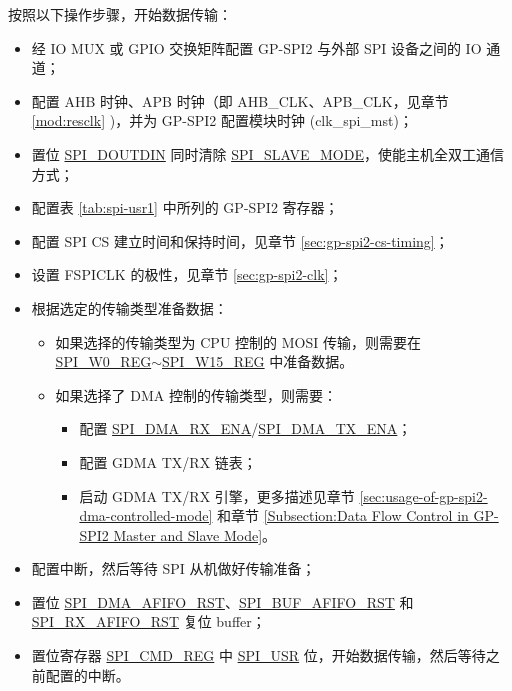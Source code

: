 \documentclass[main\_\_CN.tex]{subfiles}
\begin{document}
按照以下操作步骤，开始数据传输：
\begin{itemize}
    \item 经 IO MUX 或 GPIO 交换矩阵配置 GP-SPI2 与外部 SPI 设备之间的 IO 通道；
    \item 配置 AHB 时钟、APB 时钟（即 AHB\_CLK、APB\_CLK，见章节 \ref{mod:resclk} \textit{})，并为 GP-SPI2 配置模块时钟 (clk\_spi\_mst)；
    \item 置位 \hyperref[fielddesc:SPIDOUTDIN]{SPI\_DOUTDIN} 同时清除 \hyperref[fielddesc:SPISLAVEMODE]{SPI\_SLAVE\_MODE}，使能主机全双工通信方式；

    \item 配置表 \ref{tab:spi-usr1} 中所列的 GP-SPI2 寄存器；

    \item 配置 SPI CS 建立时间和保持时间，见章节  \ref{sec:gp-spi2-cs-timing}；

    \item 设置 FSPICLK 的极性，见章节  \ref{sec:gp-spi2-clk}；

    \item 根据选定的传输类型准备数据：
    \begin{itemize}
        \item 如果选择的传输类型为 CPU 控制的 MOSI 传输，则需要在 \hyperref[regdesc:SPIW0REG]{SPI\_W0\_REG}$\sim$\hyperref[regdesc:SPIW15REG]{SPI\_W15\_REG} 中准备数据。

        \item 如果选择了 DMA 控制的传输类型，则需要：
        \begin{itemize}
            \item 配置 \hyperref[fielddesc:SPIDMARXENA]{SPI\_DMA\_RX\_ENA}/\hyperref[fielddesc:SPIDMATXENA]{SPI\_DMA\_TX\_ENA}；
            \item 配置 GDMA TX/RX 链表；
            \item 启动 GDMA TX/RX 引擎，更多描述见章节  \ref{sec:usage-of-gp-spi2-dma-controlled-mode} 和章节  \ref{Subsection:Data Flow Control in GP-SPI2 Master and Slave Mode}。
        \end{itemize}
    \end{itemize}
    \item 配置中断，然后等待 SPI 从机做好传输准备；

    \item 置位 \hyperref[fielddesc:SPIDMAAFIFORST]{SPI\_DMA\_AFIFO\_RST}、\hyperref[fielddesc:SPIBUFAFIFORST]{SPI\_BUF\_AFIFO\_RST} 和 \hyperref[fielddesc:SPIRXAFIFORST]{SPI\_RX\_AFIFO\_RST} 复位 buffer；

    \item 置位寄存器 \hyperref[regdesc:SPICMDREG]{SPI\_CMD\_REG} 中 \hyperref[fielddesc:SPIUSR]{SPI\_USR} 位，开始数据传输，然后等待之前配置的中断。

\end{itemize}
\end{document}
